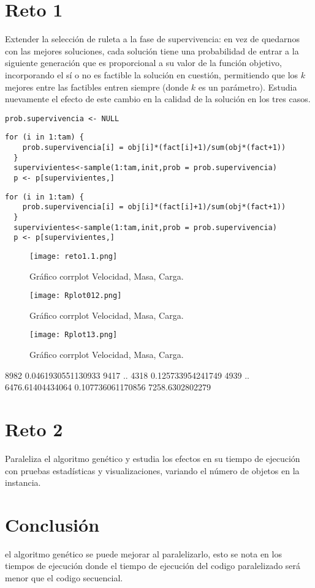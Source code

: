 \documentclass[10pt,a4paper]{article}
\begin{document}
\begin{multicols}{2}
\section{Reto 1}
	Extender la selección de ruleta a la fase de supervivencia: en vez de quedarnos con las mejores soluciones, cada solución tiene una probabilidad de entrar a la siguiente generación que es proporcional a su valor de la función objetivo, incorporando el sí o no es factible la solución en cuestión, permitiendo que los $k$ mejores entre las factibles entren siempre (donde $k$ es un parámetro). Estudia nuevamente el efecto de este cambio en la calidad de la solución en los tres casos.
	
\begin{lstlisting}
prob.supervivencia <- NULL
\end{lstlisting}
\begin{lstlisting}
for (i in 1:tam) {
    prob.supervivencia[i] = obj[i]*(fact[i]+1)/sum(obj*(fact+1))
  }
  supervivientes<-sample(1:tam,init,prob = prob.supervivencia)
  p <- p[supervivientes,]
\end{lstlisting}
\begin{lstlisting}
for (i in 1:tam) {
    prob.supervivencia[i] = obj[i]*(fact[i]+1)/sum(obj*(fact+1))
  }
  supervivientes<-sample(1:tam,init,prob = prob.supervivencia)
  p <- p[supervivientes,]
\end{lstlisting}
\begin{figure}[H]
				\centering
				\texttt{[image: reto1.1.png]}
				\caption{Gráfico corrplot Velocidad, Masa, Carga.}
				\label{fig: Figura1}
\end{figure}
\begin{figure}[H]
				\centering
				\texttt{[image: Rplot012.png]}
				\caption{Gráfico corrplot Velocidad, Masa, Carga.}
				\label{fig: Figura1}
\end{figure}
\begin{figure}[H]
				\centering
				\texttt{[image: Rplot13.png]}
				\caption{Gráfico corrplot Velocidad, Masa, Carga.}
				\label{fig: Figura1}
\end{figure}
8982 0.0461930551130933 9417
..
4318 0.125733954241749 4939
..
6476.61404434064 0.107736061170856 7258.6302802279
	\section{Reto 2}
	Paraleliza el algoritmo genético y estudia los efectos en su tiempo de ejecución con pruebas estadísticas y visualizaciones, variando el número de objetos en la instancia.
		\section{Conclusión}
el algoritmo genético se puede mejorar al paralelizarlo, esto se nota en los tiempos de ejecución donde el tiempo de ejecución del codigo paralelizado será menor que el codigo secuencial.


	\end{multicols}

	
\end{document}
